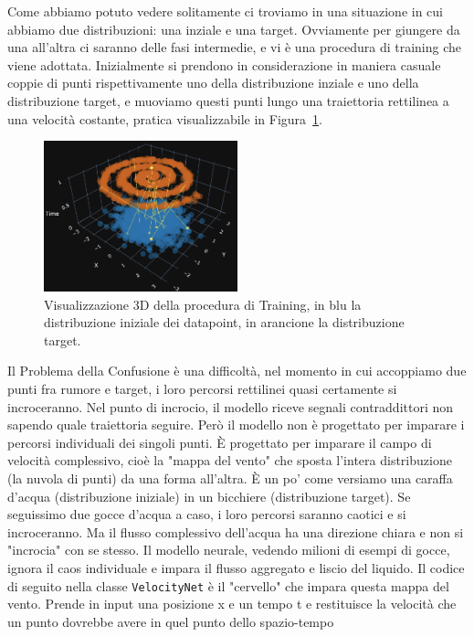 Come abbiamo potuto vedere solitamente ci troviamo in una situazione in cui abbiamo due distribuzioni: una inziale e una target. Ovviamente per giungere da una all'altra ci saranno delle fasi intermedie, e vi è una procedura di training che viene adottata. Inizialmente si prendono in considerazione in maniera casuale coppie di punti rispettivamente uno della distribuzione inziale e uno della distribuzione target, e muoviamo questi punti lungo una traiettoria rettilinea a una velocità costante, pratica visualizzabile in Figura~\ref{fig:FMTrain}.
\begin{figure}
    \centering
    \includegraphics[width=0.5\textwidth]{figure/FMTrain.png}
    \caption{Visualizzazione 3D della procedura di Training, in blu la distribuzione iniziale dei datapoint, in arancione la distribuzione target.}
    \label{fig:FMTrain}
\end{figure}
Il Problema della Confusione è una difficoltà, nel momento in cui accoppiamo due punti fra rumore e target, i loro percorsi rettilinei quasi certamente si incroceranno. Nel punto di incrocio, il modello riceve segnali contraddittori non sapendo quale traiettoria seguire. Però il modello non è progettato per imparare i percorsi individuali dei singoli punti. È progettato per imparare il campo di velocità complessivo, cioè la "mappa del vento" che sposta l'intera distribuzione (la nuvola di punti) da una forma all'altra. È un po' come versiamo una caraffa d'acqua (distribuzione iniziale) in un bicchiere (distribuzione target). Se seguissimo due gocce d'acqua a caso, i loro percorsi saranno caotici e si incroceranno. Ma il flusso complessivo dell'acqua ha una direzione chiara e non si "incrocia" con se stesso. Il modello neurale, vedendo milioni di esempi di gocce, ignora il caos individuale e impara il flusso aggregato e liscio del liquido. Il codice di seguito nella classe \texttt{VelocityNet} è il "cervello" che impara questa mappa del vento. Prende in input una posizione x e un tempo t e restituisce la velocità che un punto dovrebbe avere in quel punto dello spazio-tempo

